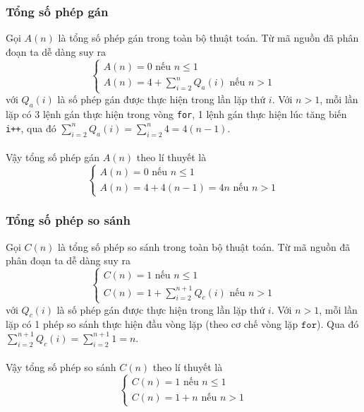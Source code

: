 \documentclass[12pt]{article}
\begin{document}
\subsubsection{Tổng số phép gán}
Gọi $A(n)$ là tổng số phép gán trong toàn bộ thuật toán. Từ mã nguồn đã phân đoạn ta dễ dàng suy ra 
$$
\begin{cases}
A(n) = 0 \text{ nếu $n \leq 1$}\\
\displaystyle A(n) = 4 + \sum^{n}_{i = 2} Q_a(i) \text{ nếu $n > 1$}
\end{cases}
$$
với $Q_a(i)$ là số phép gán được thực hiện trong lần lặp thứ $i$.
Với $n > 1$, mỗi lần lặp có 3 lệnh gán thực hiện trong vòng \texttt{for}, 1 lệnh gán thực hiện lúc tăng biến \texttt{i++}, qua đó $\displaystyle \sum_{i = 2}^{n} Q_a(i) = \sum_{i = 2}^{n} 4 = 4(n - 1)$.
\\\\
Vậy tổng số phép gán $A(n)$ theo lí thuyết là
$$
\begin{cases}
A(n) = 0 \text{ nếu $n \leq 1$}\\
A(n) = 4 + 4(n - 1) = 4n \text{ nếu $n > 1$}
\end{cases}
$$

\subsubsection{Tổng số phép so sánh}
Gọi $C(n)$ là tổng số phép so sánh trong toàn bộ thuật toán. Từ mã nguồn đã phân đoạn ta dễ dàng suy ra
$$
\begin{cases}
C(n) = 1 \text{ nếu $n \leq 1$}\\
\displaystyle C(n) = 1 + \sum_{i = 2}^{n + 1} Q_c(i) \text{ nếu $n > 1$}
\end{cases}
$$
với $Q_c(i)$ là số phép gán được thực hiện trong lần lặp thứ $i$. Với $n > 1$, mỗi lần lặp có 1 phép so sánh thực hiện đầu vòng lặp (theo cơ chế vòng lặp $\texttt{for}$). Qua đó $\displaystyle \sum_{i = 2}^{n + 1} Q_c(i) = \sum_{i = 2}^{n + 1} 1 = n$.
\\\\
Vậy tổng số phép so sánh $C(n)$ theo lí thuyết là
$$
\begin{cases}
C(n) = 1 \text{ nếu $n \leq 1$}\\
C(n) = 1 + n \text{ nếu $n > 1$}
\end{cases}
$$
\end{document}
